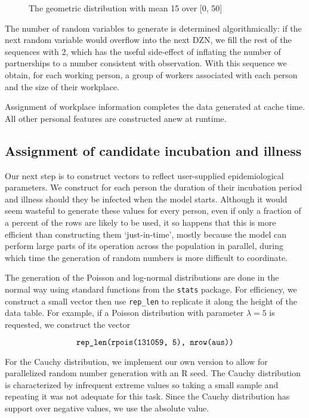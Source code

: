 \documentclass{grattan}
\newcommand*{\code}[1]{\texttt{#1}}
\begin{document}
\begin{figure}[!htbp]
\caption{The geometric distribution with mean 15 over [0, 50]}\label{fig:geom-distr}
\par
	
\end{figure}

The number of random variables to generate is determined algorithmically: if the next random variable
would overflow into the next DZN, we fill the rest of the sequences with 2, which has the useful
side-effect of inflating the number of partnerships to a number consistent with observation.
With this sequence we obtain, for each working person, a group of workers associated with each person
and the size of their workplace.

Assignment of workplace information completes the data generated at cache time. All other personal
features are constructed anew at runtime.

\subsection{Assignment of candidate incubation and illness }

Our next step is to construct vectors to reflect user-supplied epidemiological parameters.
We construct for each person the duration of their incubation period and illness should they
be infected when the model starts. Although it would seem wasteful to generate these values
for every person, even if only a fraction of a percent of the rows are likely to be used, it
so happens that this is more efficient than constructing them `just-in-time', mostly because
the model can perform large parts of its operation across the population in parallel, during
which time the generation of random numbers is more difficult to coordinate.

The generation of the Poisson and log-normal distributions are done in the normal way using
 standard functions from the \code{stats} package.  For efficiency, we construct a small vector
 then use \code{rep\_len} to replicate it along the height of the data table. For example, if
 a Poisson distribution with parameter \(\lambda = 5\) is requested, we construct the vector

\[\text{\code{rep\_len(rpois(131059, 5), nrow(aus))}} \]

 For the Cauchy distribution, we implement our own version to allow for parallelized random
 number generation with an R seed. The Cauchy distribution is characterized by infrequent
 extreme values so taking a small sample and repeating it was not adequate for this task.
 Since the Cauchy distribution has support over negative values,
 we use the absolute value.
\end{document}
